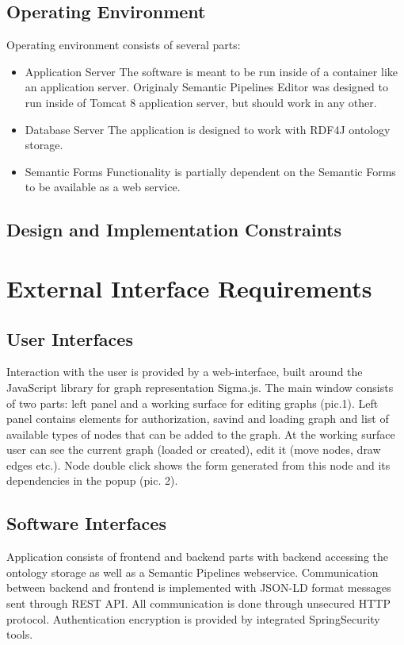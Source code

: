 \documentclass{article}
\begin{document}
\subsection{Operating Environment}
Operating environment consists of several parts:
\begin{itemize}
    \item Application Server
	The software is meant to be run inside of a container like an application server. Originaly Semantic Pipelines Editor was designed to run inside of Tomcat 8 application server, but should work in any other.
    \item Database Server
	The application is designed to work with RDF4J ontology storage.
    \item Semantic Forms
	Functionality is partially dependent on the Semantic Forms to be available as a web service.
\end{itemize}
\subsection{Design and Implementation Constraints}
\section{External Interface Requirements}
\subsection{User Interfaces}
Interaction with the user is provided by a web-interface, built around the JavaScript library for graph representation Sigma.js. The main window consists of two parts: left panel and a working surface for editing graphs (pic.1). Left panel contains elements for authorization, savind and loading graph and list of available types of nodes that can be added to the graph. At the working surface user can see the current graph (loaded or created), edit it (move nodes, draw edges etc.). Node double click shows the form generated from this node and its dependencies in the popup (pic. 2).
\subsection{Software Interfaces}
Application consists of frontend and backend parts with backend accessing the ontology storage as well as a Semantic Pipelines webservice. Communication between backend and frontend is implemented with JSON-LD format messages sent through REST API. All communication is done through unsecured HTTP protocol. Authentication encryption is provided by integrated SpringSecurity tools. 
\end{document}
